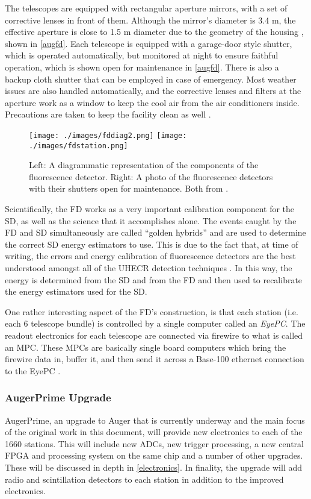 The telescopes are equipped with rectangular aperture mirrors, with a set of corrective lenses in front of them. Although the mirror's diameter is 3.4 m, the effective aperture is close to 1.5 m diameter due to the geometry of the housing \cite{fddiam}, shown in \autoref{augfd}. Each telescope is equipped with a garage-door style shutter, which is operated automatically, but monitored at night to ensure faithful operation, which is shown open for maintenance in \autoref{augfd}. There is also a backup cloth shutter that can be employed in case of emergency. Most weather issues are also handled automatically, and the corrective lenses and filters at the aperture work as a window to keep the cool air from the air conditioners inside. Precautions are taken to keep the facility clean as well \cite{auger2015}. 
\begin{figure}[h!]
\begin{center}
\texttt{[image: ./images/fddiag2.png]}
\texttt{[image: ./images/fdstation.png]}
\caption[Auger Fluorescence Detector]{Left: A diagrammatic representation of the components of the fluorescence detector. Right: A photo of the fluorescence detectors with their shutters open for maintenance. Both from \cite{auger2015}.}
\label{augfd}
\end{center}
\end{figure}
Scientifically, the FD works as a very important calibration component for the SD, as well as the science that it accomplishes alone. The events caught by the FD and SD simultaneously are called ``golden hybrids'' and are used to determine the correct SD energy estimators to use. This is due to the fact that, at time of writing, the errors and energy calibration of fluorescence detectors are the best understood amongst all of the UHECR detection techniques \cite{schroeder}. In this way, the energy is determined from the SD and from the FD and then used to recalibrate the energy estimators used for the SD.

One rather interesting aspect of the FD's construction, is that each station (i.e. each 6 telescope bundle) is controlled by a single computer called an \textit{EyePC}. The readout electronics for each telescope are connected via firewire to what is called an MPC. These MPCs are basically single board computers which bring the firewire data in, buffer it, and then send it across a Base-100 ethernet connection to the EyePC \cite{auger2015}.
\subsubsection{AugerPrime Upgrade}
AugerPrime, an upgrade to Auger that is currently underway and the main focus of the original work in this document, will provide new electronics to each of the 1660 stations. This will include new ADCs, new trigger processing, a new central FPGA and processing system on the same chip and a number of other upgrades. These will be discussed in depth in \autoref{electronics}. In finality, the upgrade will add radio and scintillation detectors to each station in addition to the improved electronics.
